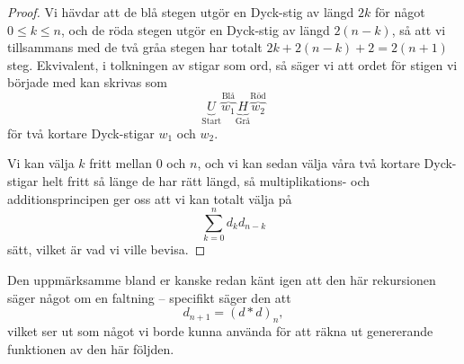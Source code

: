 \documentclass{tufte-handout}
\begin{document}
\begin{lemma}
\begin{proof}
        Vi hävdar att de blå stegen utgör en Dyck-stig av längd $2k$ för något $0 \leq k \leq n$, och de röda stegen utgör en Dyck-stig av längd $2(n-k)$, så att vi tillsammans med de två gråa stegen har totalt $2k + 2(n-k) + 2 = 2(n+1)$ steg. Ekvivalent, i tolkningen av stigar som ord, så säger vi att ordet för stigen vi började med kan skrivas som
        $$\underbrace{U}_{\text{Start}}\overbrace{w_1}^{\text{Blå}}\underbrace{H}_{\text{Grå}}\overbrace{w_2}^{\text{Röd}}$$
        för två kortare Dyck-stigar $w_1$ och $w_2$.

        Vi kan välja $k$ fritt mellan $0$ och $n$, och vi kan sedan välja våra två kortare Dyck-stigar helt fritt så länge de har rätt längd, så multiplikations- och additionsprincipen ger oss att vi kan totalt välja på
        $$\sum_{k=0}^{n} d_k d_{n-k}$$
        sätt, vilket är vad vi ville bevisa.
    \end{proof}
\end{lemma}

Den uppmärksamme bland er kanske redan känt igen att den här rekursionen säger något om en faltning -- specifikt säger den att
$$d_{n+1} = (d * d)_n,$$
vilket ser ut som något vi borde kunna använda för att räkna ut genererande funktionen av den här följden.
\end{document}

